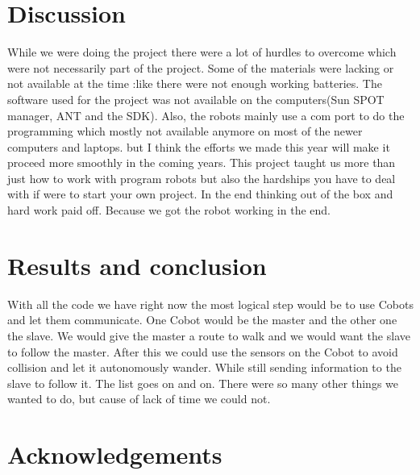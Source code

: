 \documentclass[a4paper,10pt]{article} %
\begin{document}
\section{Discussion} %
While we were doing the project there were a lot of hurdles to overcome which
were not necessarily part of the project. Some of the materials were lacking
or not available at the time :like there were not enough working batteries.
The software used for the project was not available on the computers(Sun SPOT
manager, ANT and the SDK). Also,
the robots mainly use a com port to do the programming which mostly not
available anymore on most of the newer computers and laptops. but I think
the efforts we made this year will make it proceed more smoothly in the coming
years. This project taught us more than just how to work with program robots
but also the hardships you have to deal with if were to start your own project.
In the end thinking out of the box and hard work paid off. Because we
got the robot working in the end.

\section{Results and conclusion} %


With all the code we have right now the most logical step would be to use Cobots
and let them communicate. One Cobot would be the master and the other one the
slave. We would give the master a route to walk and we would want the slave to
follow the master. After this we could use the sensors on the Cobot to avoid
collision and let it autonomously wander. While still sending information to the
slave to follow it. The list goes on and on. There were so many other things we
wanted to do, but cause of lack of time we could not.



\section{Acknowledgements} %
\end{document}
